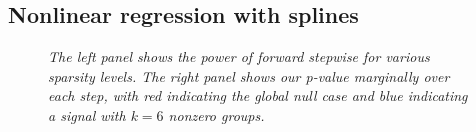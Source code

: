 \documentclass{imsart}
\begin{document}
\subsection{Nonlinear regression with splines}

\begin{figure}
\begin{center}
\hspace{-15pt}
\caption{\small \it The left panel shows the power of forward stepwise
for various sparsity levels. The right panel shows our p-value marginally
over each step, with red indicating the global null case and blue
indicating a signal with $k=6$ nonzero groups.}
\label{fig:spline}
\end{center}
\end{figure}
\end{document}
